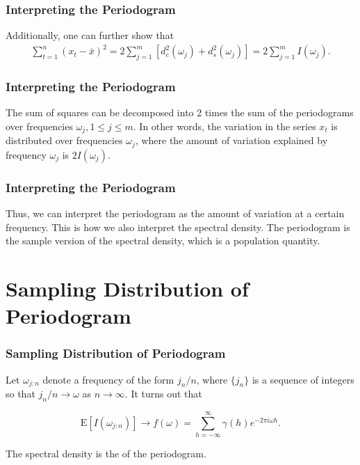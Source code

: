 \documentclass[%
xcolor=pdftex]{beamer}
\begin{document}
\begin{frame}
\frametitle{Interpreting the Periodogram}

Additionally, one can further show that
\begin{eqnarray*}
\sum^n_{t=1}(x_t-\bar{x})^2 =  2\sum^{m}_{j=1}[d^2_c(\omega_j)+d^2_s(\omega_j)] = 2\sum^m_{j=1}I(\omega_j).
\end{eqnarray*}
\end{frame}

\begin{frame}
\frametitle{Interpreting the Periodogram}

The sum of squares can be decomposed into 2 times the
sum of the periodograms over frequencies $\omega_j,1\le j\le
m$. In other words, the variation in the series $x_t$ is
distributed over frequencies $\omega_j$, where the amount of variation explained by
frequency $\omega_j$ is $2I(\omega_j)$.

\end{frame}

\begin{frame}
\frametitle{Interpreting the Periodogram}

Thus, we can interpret the periodogram as the amount of
variation at a certain frequency.  This is how we also
interpret the spectral density.  The periodogram is the sample
version of the spectral density, which is a population quantity.

\end{frame}

\section{Sampling Distribution of Periodogram}
\frame{\tableofcontents[currentsection]}

\begin{frame}
\frametitle{Sampling Distribution of Periodogram}

Let $\omega_{j:n}$ denote a frequency of the form $j_n/n$, where $\{ j_n\}$ is a sequence of integers so that $j_n/n \to \omega$ as $n \to \infty$. It turns out that

$$
\mbox{E}[I(\omega_{j:n})] \to f(\omega) = \sum^\infty_{h=-\infty} \gamma(h) e^{-2\pi i\omega h}.
$$

The spectral density is the \underline{\hspace{30 mm}} of the periodogram.

\end{frame}
\end{document}
